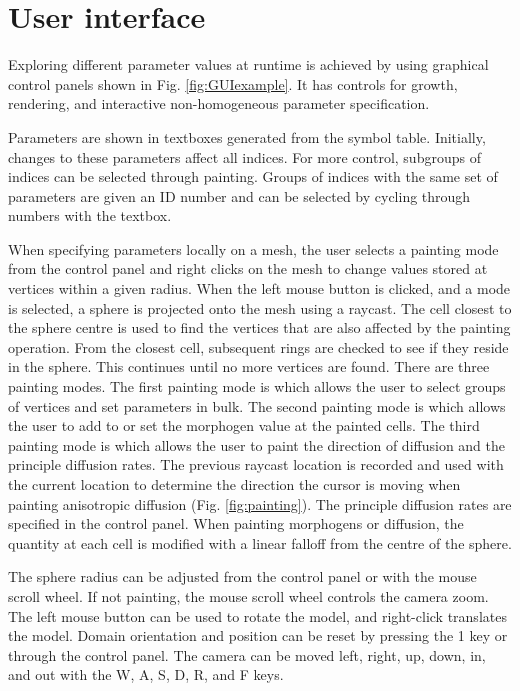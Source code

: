 \section{User interface}
Exploring different parameter values at runtime is achieved by using graphical control panels shown in Fig. \ref{fig:GUIexample}. It has controls for growth, rendering, and interactive non-homogeneous parameter specification. 

Parameters are shown in textboxes generated from the symbol table. Initially, changes to these parameters affect all indices. For more control, subgroups of indices can be selected through painting. Groups of indices with the same set of parameters are given an ID number and can be selected by cycling through numbers with the  textbox. 

When specifying parameters locally on a mesh, the user selects a painting mode from the control panel and right clicks on the mesh to change values stored at vertices within a given radius. When the left mouse button is clicked, and a mode is selected, a sphere is projected onto the mesh using a raycast. The cell closest to the sphere centre is used to find the vertices that are also affected by the painting operation. From the closest cell, subsequent rings are checked to see if they reside in the sphere. This continues until no more vertices are found. There are three painting modes. The first painting mode is  which allows the user to select groups of vertices and set parameters in bulk. The second painting mode is  which allows the user to add to or set the morphogen value at the painted cells. The third painting mode is  which allows the user to paint the direction of diffusion and the principle diffusion rates. The previous raycast location is recorded and used with the current location to determine the direction the cursor is moving when painting anisotropic diffusion (Fig. \ref{fig:painting}). The principle diffusion rates are specified in the control panel. When painting morphogens or diffusion, the quantity at each cell is modified with a linear falloff from the centre of the sphere.

The sphere radius can be adjusted from the control panel or with the mouse scroll wheel. If not painting, the mouse scroll wheel controls the camera zoom. The left mouse button can be used to rotate the model, and right-click translates the model. Domain orientation and position can be reset by pressing the 1 key or through the control panel. The camera can be moved left, right, up, down, in, and out with the W, A, S, D, R, and F keys.

